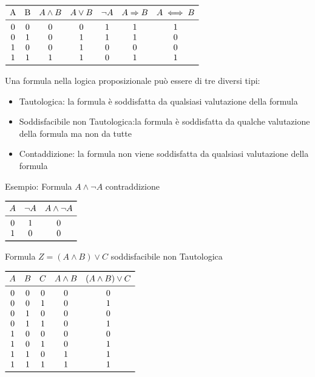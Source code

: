 $\begin{array}{ccccccc}
\toprule
\text{A} & \text{B} & A \land B & A \lor B & \neg A & A \Rightarrow B & A \iff B \\
\midrule
    0 & 0 & 0 & 0 & 1 & 1 & 1 \\
    0 & 1 & 0 & 1 & 1 & 1 & 0 \\
    1 & 0 & 0 & 1 & 0 & 0 & 0 \\
    1 & 1 & 1 & 1 & 0 & 1 & 1 \\
\bottomrule
\end{array}$\newline

Una formula nella logica proposizionale può essere di tre diversi tipi:

\begin{itemize}
  \item Tautologica: la formula è soddisfatta da qualsiasi valutazione della formula
  \item Soddisfacibile non Tautologica:la formula è soddisfatta da qualche valutazione
        della formula ma non da tutte
  \item Contaddizione: la formula non viene soddisfatta da qualsiasi valutazione della formula
\end{itemize}

Esempio:\newline
Formula $A \land \neg A$ \quad contraddizione

$\begin{array}{ccc}
\toprule A & \neg A & A \land \neg A \\
\midrule
        0 & 1 & 0 \\
        1 & 0 & 0 \\
\bottomrule
\end{array}$\newpage

Formula $Z = (A \land B) \lor C$  soddisfacibile non Tautologica

$\begin{array}{ccccc}
\toprule A & B & C & A \land B & (A \land B) \lor C \\
\midrule
         0 & 0 & 0 & 0 & 0 \\
         0 & 0 & 1 & 0 & 1 \\
         0 & 1 & 0 & 0 & 0 \\
         0 & 1 & 1 & 0 & 1 \\
         1 & 0 & 0 & 0 & 0 \\
         1 & 0 & 1 & 0 & 1 \\
         1 & 1 & 0 & 1 & 1 \\
         1 & 1 & 1 & 1 & 1 \\
\bottomrule
\end{array}$\newline

